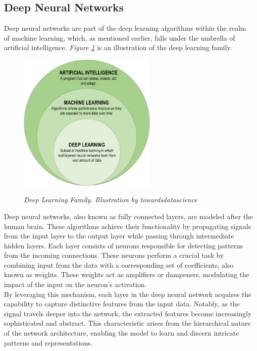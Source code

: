 \subsection{Deep Neural Networks}

Deep neural networks are part of the deep learning algorithms within the realm of machine learning, which, as mentioned earlier, falls under the umbrella of artificial intelligence. \textit{Figure \ref{fig:deep-learning-family}} is an illustration of the deep learning family. \\

\begin{figure}[H]
\centering
\includegraphics[width=0.6\textwidth]{imatges/preliminaries/deep-learning-familiy.png}
\caption[Deep Learning Family]{\textit{Deep Learning Family. Illustration by towardsdatascience}}
{\label{fig:deep-learning-family}}
\end{figure}

Deep neural networks, also known as fully connected layers, are modeled after the human brain. These algorithms achieve their functionality by propagating signals from the input layer to the output layer while passing through intermediate hidden layers. Each layer consists of neurons responsible for detecting patterns from the incoming connections. These neurons perform a crucial task by combining input from the data with a corresponding set of coefficients, also known as weights. These weights act as amplifiers or dampeners, modulating the impact of the input on the neuron's activation. \\

By leveraging this mechanism, each layer in the deep neural network acquires the capability to capture distinctive features from the input data. Notably, as the signal travels deeper into the network, the extracted features become increasingly sophisticated and abstract. This characteristic arises from the hierarchical nature of the network architecture, enabling the model to learn and discern intricate patterns and representations. \\

